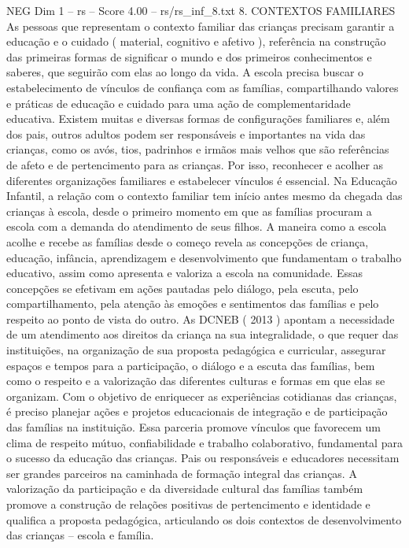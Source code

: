 \begin{textsample}{NEG Dim 1 – rs – Score 4.00 – rs/rs\_inf\_8.txt}  \label{ex:f1_neg_090}
8.
CONTEXTOS FAMILIARES As pessoas que representam o contexto familiar das crianças precisam garantir a educação e o cuidado ( material, cognitivo e afetivo ), referência na construção das primeiras formas de significar o mundo e dos primeiros conhecimentos e saberes, que seguirão com elas ao longo da vida.
A escola precisa buscar o estabelecimento de vínculos de confiança com as famílias, compartilhando valores e práticas de educação e cuidado para uma ação de complementaridade educativa.
Existem muitas e diversas formas de configurações familiares e, além dos pais, outros adultos podem ser responsáveis e importantes na vida das crianças, como os avós, tios, padrinhos e irmãos mais velhos que são referências de afeto e de pertencimento para as crianças.
Por isso, reconhecer e acolher as diferentes organizações familiares e estabelecer vínculos é essencial.
Na Educação Infantil, a relação com o contexto familiar tem início antes mesmo da chegada das crianças à escola, desde o primeiro momento em que as famílias procuram a escola com a demanda do atendimento de seus filhos.
A maneira como a escola acolhe e recebe as famílias desde o começo revela as concepções de criança, educação, infância, aprendizagem e desenvolvimento que fundamentam o trabalho educativo, assim como apresenta e valoriza a escola na comunidade.
Essas concepções se efetivam em ações pautadas pelo diálogo, pela escuta, pelo compartilhamento, pela atenção às emoções e sentimentos das famílias e pelo respeito ao ponto de vista do outro.
As DCNEB ( 2013 ) apontam a necessidade de um atendimento aos direitos da criança na sua integralidade, o que requer das instituições, na organização de sua proposta pedagógica e curricular, assegurar espaços e tempos para a participação, o diálogo e a escuta das famílias, bem como o respeito e a valorização das diferentes culturas e formas em que elas se organizam.
Com o objetivo de enriquecer as experiências cotidianas das crianças, é preciso planejar ações e projetos educacionais de integração e de participação das famílias na instituição.
Essa parceria promove vínculos que favorecem um clima de respeito mútuo, confiabilidade e trabalho colaborativo, fundamental para o sucesso da educação das crianças.
Pais ou responsáveis e educadores necessitam ser grandes parceiros na caminhada de formação integral das crianças.
A valorização da participação e da diversidade cultural das famílias também promove a construção de relações positivas de pertencimento e identidade e qualifica a proposta pedagógica, articulando os dois contextos de desenvolvimento das crianças – escola e família.

\end{textsample}
